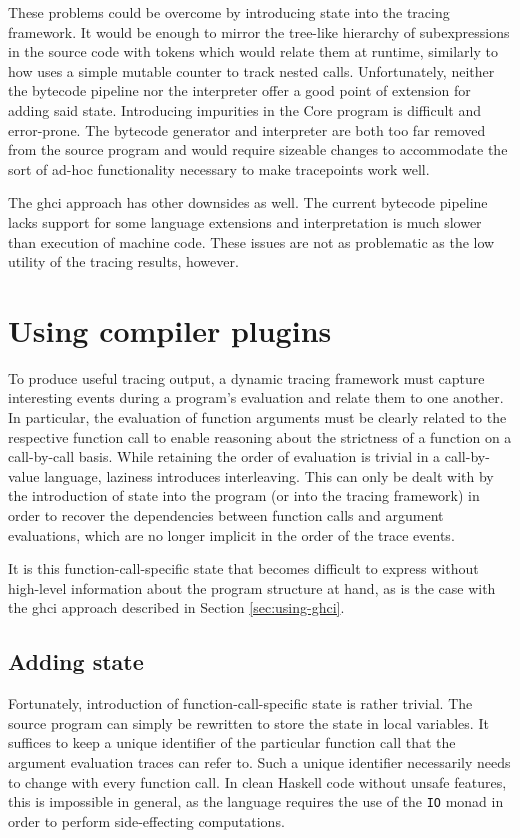 \documentclass[thesis=B,english]{FITthesis}[2019/12/23]
\newcommand{\hsType}[1]{\texttt{#1}}
\begin{document}
These problems could be overcome by introducing state into the tracing
framework. It would be enough to mirror the tree-like hierarchy of
subexpressions in the source code with tokens which would relate them at
runtime, similarly to how  uses a simple mutable counter to
track nested calls. Unfortunately, neither the bytecode pipeline nor the
interpreter offer a good point of extension for adding said state. Introducing
impurities in the Core program is difficult and error-prone. The bytecode
generator and interpreter are both too far removed from the source program and
would require sizeable changes to accommodate the sort of ad-hoc functionality
necessary to make tracepoints work well.

The \acrshort{ghci} approach has other downsides as well. The current bytecode
pipeline lacks support for some language extensions and interpretation is much
slower than execution of machine code. These issues are not as problematic as
the low utility of the tracing results, however.

\section{Using compiler plugins}
To produce useful tracing output, a dynamic tracing framework must capture
interesting events during a program's evaluation and relate them to one
another. In particular, the evaluation of function arguments must be clearly
related to the respective function call to enable reasoning about the
strictness of a function on a call-by-call basis. While retaining the order of
evaluation is trivial in a call-by-value language, laziness introduces
interleaving. This can only be dealt with by the introduction of state into the
program (or into the tracing framework) in order to recover the dependencies
between function calls and argument evaluations, which are no longer implicit
in the order of the trace events.

It is this function-call-specific state that becomes difficult to express
without high-level information about the program structure at hand, as is the
case with the \acrshort{ghci} approach described in Section
\ref{sec:using-ghci}.

\subsection*{Adding state}
Fortunately, introduction of function-call-specific state is rather trivial.
The source program can simply be rewritten to store the state in local
variables. It suffices to keep a unique identifier of the particular function
call that the argument evaluation traces can refer to. Such a unique identifier
necessarily needs to change with every function call. In clean Haskell code
without unsafe features, this is impossible in general, as the language
requires the use of the \hsType{IO} monad in order to perform side-effecting
computations.
\end{document}

